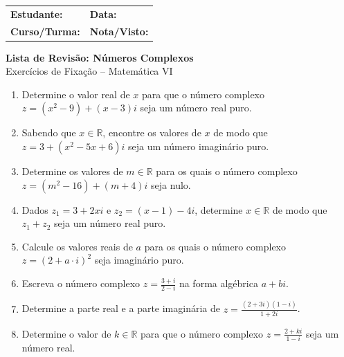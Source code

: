 \documentclass[12pt,a4paper]{article}
\begin{document}
\begin{tcolorbox}[colback=bglight, colframe=primary, boxrule=1pt, arc=3pt]
  \sffamily\small
  \begin{tabular}{@{}p{} p{}@{}}
    \textbf{Estudante:} \hrulefill & \textbf{Data:} \hrulefill \\[0.25cm]
    \textbf{Curso/Turma:} \hrulefill & \textbf{Nota/Visto:} \hrulefill
  \end{tabular}
\end{tcolorbox}

\begin{center}
  {\LARGE\bfseries\color{primary} Lista de Revisão: Números Complexos} \\[0.1cm]
  {\small\sffamily\color{gray} Exercícios de Fixação -- Matemática VI}
\end{center}

\vspace{0.2cm}



\begin{enumerate}
    \item Determine o valor real de $x$ para que o número complexo $z = (x^2 - 9) + (x - 3)i$ seja um número real puro.

    \item Sabendo que $x \in \mathbb{R}$, encontre os valores de $x$ de modo que $z = 3 + (x^2 - 5x + 6)i$ seja um número imaginário puro.

    \item Determine os valores de $m \in \mathbb{R}$ para os quais o número complexo $z = (m^2 - 16) + (m + 4)i$ seja nulo.

    \item Dados $z_1 = 3 + 2xi$ e $z_2 = (x - 1) - 4i$, determine $x \in \mathbb{R}$ de modo que $z_1 + z_2$ seja um número real puro.

    \item Calcule os valores reais de $a$ para os quais o número complexo $z = (2 + a \cdot i)^2$ seja imaginário puro.

    \item Escreva o número complexo $z = \frac{3 + i}{2 - i}$ na forma algébrica $a + bi$.

    \item Determine a parte real e a parte imaginária de $z = \frac{(2 + 3i)(1 - i)}{1 + 2i}$.

    \item Determine o valor de $k \in \mathbb{R}$ para que o número complexo $z = \frac{2 + ki}{1 - i}$ seja um número real.
\end{enumerate}
\end{document}

